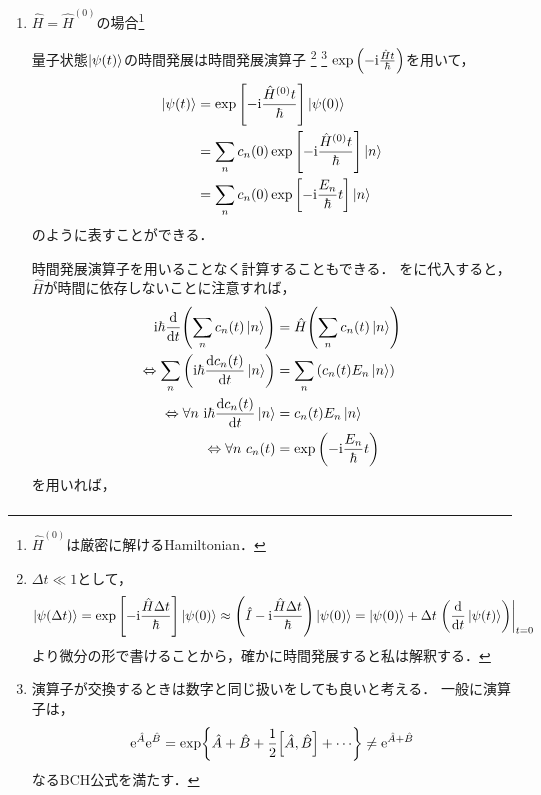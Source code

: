 \documentclass{report}
\begin{document}
  \begin{enumerate}
    \item $\hat{H} = \hat{H}^{(0)}$の場合\footnote{$\hat{H}^{(0)}$は厳密に解けるHamiltonian．}\par
      量子状態$\ket{\psi(t)}$の時間発展は時間発展演算子
      \footnote{
        $\Delta t \ll 1$として，
        \begin{align*}
          \ket{\psi(\Delta t)} = \exp\qty[-\mathrm{i}\frac{\hat{H}\Delta t}{\hbar}]\ket{\psi(0)} \approx\qty(\hat{I} - \mathrm{i}\frac{\hat{H}\Delta t}{\hbar})\ket{\psi(0)} 
          = \ket{\psi(0)} + \Delta t \left.\qty(\dv{t}\ket{\psi(t)})\right|_{t = 0}
        \end{align*}
        より微分の形で書けることから，確かに時間発展すると私は解釈する．}
      \footnote{
        演算子が交換するときは数字と同じ扱いをしても良いと考える．
        一般に演算子は，
        \begin{align*}
          \mathrm{e}^{\hat{A}}\mathrm{e}^{\hat{B}} = \exp{\hat{A} + \hat{B} + \frac{1}{2}\qty[\hat{A},\hat{B}] + \cdots}\neq\mathrm{e}^{\hat{A} + \hat{B}}
        \end{align*}
        なるBCH公式を満たす．
      }
      $\exp\qty(-\mathrm{i}\frac{\hat{H}t}{\hbar})$を用いて，
      \begin{align}
        \ket{\psi(t)} &= \exp\qty[-\mathrm{i}\frac{\hat{H}^{(0)}t}{\hbar}]\ket{\psi(0)} \\
        &= \sum_{n}c_n(0)\exp\qty[-\mathrm{i}\frac{\hat{H}^{(0)}t}{\hbar}]\ket{n} \\
        &= \sum_{n}c_n(0)\exp\qty[-\mathrm{i}\frac{E_n}{\hbar}t]\ket{n}
      \end{align}
      のように表すことができる．
      \par
      時間発展演算子を用いることなく計算することもできる．
      をに代入すると，$\hat{H}$が時間に依存しないことに注意すれば，
      \begin{align}
        \mathrm{i}\hbar\dv{t}\qty(\sum_{n}c_n(t)\ket{n}) &= \hat{H}\qty(\sum_{n}c_n(t)\ket{n}) \label{naive-solution-to-decide-ct}\\ 
        \Leftrightarrow \sum_{n}\qty(\mathrm{i}\hbar\dv{c_n(t)}{t}\ket{n}) &= \sum_{n}\qty(c_n(t)E_n\ket{n}) \\ 
        \Leftrightarrow \forall n\ \mathrm{i}\hbar\dv{c_n(t)}{t}\ket{n} &= c_n(t)E_n\ket{n} \\ 
        \Leftrightarrow \forall n\ c_n(t) &= \exp\qty(-\mathrm{i}\frac{E_n}{\hbar}t)
      \end{align}
      を用いれば，
      \begin{align}

\end{align}
\end{enumerate}
\end{document}
